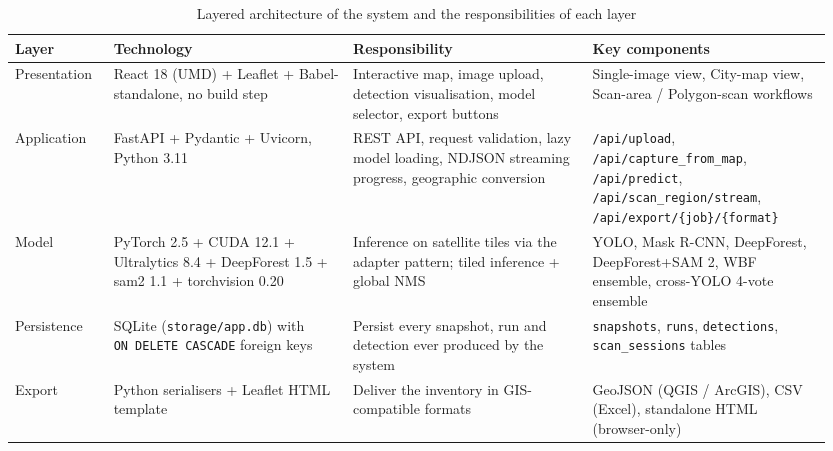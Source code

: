 \begin{longtable}[]{@{}>{\raggedright\arraybackslash}p{0.119\linewidth} >{\raggedright\arraybackslash}p{0.277\linewidth} >{\raggedright\arraybackslash}p{0.277\linewidth} >{\raggedright\arraybackslash}p{0.277\linewidth}@{}}
\caption{Layered architecture of the system and the responsibilities of each layer}\\
\endfirsthead

\toprule\noalign{}
\textbf{Layer} & \textbf{Technology} & \textbf{Responsibility} & \textbf{Key components} \\
\midrule\noalign{}
\endhead
\bottomrule\noalign{}
\endlastfoot
Presentation & React 18 (UMD) + Leaflet + Babel-standalone, no build step & Interactive map, image upload, detection visualisation, model selector, export buttons & Single-image view, City-map view, Scan-area / Polygon-scan workflows \\
Application & FastAPI + Pydantic + Uvicorn, Python 3.11 & REST API, request validation, lazy model loading, NDJSON streaming progress, geographic conversion & \texttt{/api/upload}, \texttt{/api/capture\_from\_map}, \texttt{/api/predict}, \texttt{/api/scan\_region/stream}, \texttt{/api/export/\{job\}/\{format\}} \\
Model & PyTorch 2.5 + CUDA 12.1 + Ultralytics 8.4 + DeepForest 1.5 + sam2 1.1 + torchvision 0.20 & Inference on satellite tiles via the adapter pattern; tiled inference + global NMS & YOLO, Mask R-CNN, DeepForest, DeepForest+SAM 2, WBF ensemble, cross-YOLO 4-vote ensemble \\
Persistence & SQLite (\texttt{storage/app.db}) with \texttt{ON\ DELETE\ CASCADE} foreign keys & Persist every snapshot, run and detection ever produced by the system & \texttt{snapshots}, \texttt{runs}, \texttt{detections}, \texttt{scan\_sessions} tables \\
Export & Python serialisers + Leaflet HTML template & Deliver the inventory in GIS-compatible formats & GeoJSON (QGIS / ArcGIS), CSV (Excel), standalone HTML (browser-only) \\
\end{longtable}

